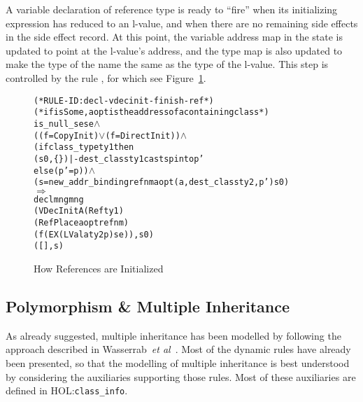 \documentclass[11pt]{article}
\newcommand{\lbr}{\texttt{\{}}
\newcommand{\rbr}{\texttt{\}}}
\newcommand{\HOLfile}[1]{HOL:\texttt{#1}}
\begin{document}
A variable declaration of reference type is ready to ``fire'' when its
initializing expression has reduced to an l-value, and when there are
no remaining side effects in the side effect record.  At this point,
the variable address map in the state is updated to point at the
l-value's address, and the type map is also updated to make the type
of the name the same as the type of the l-value.
This step is controlled by the rule ,
for which see Figure~\ref{fig:decl-vdecinit-finish-ref}.
\begin{figure}[hbtp]
\begin{center}
  \begin{minipage}{\textwidth}
%
\begin{alltt}
(* RULE-ID: decl-vdecinit-finish-ref *)
(* if isSome, aopt is the address of a containing class *)
     is_null_se se \(\land\)
     ((f = CopyInit) \(\lor\) (f = DirectInit)) \(\land\)
     (if class_type ty1 then
        (s0,\lbr\rbr) |- dest_class ty1 casts p into p'
      else (p' = p)) \(\land\)
     (s = new_addr_binding refnm aopt (a,dest_class ty2,p') s0)
   \(\Rightarrow\)
     declmng mng
             (VDecInitA (Ref ty1)
                        (RefPlace aopt refnm)
                        (f (EX (LVal a ty2 p) se)), s0)
             ([], s)
\end{alltt}
  \end{minipage}
\end{center}
\caption{How References are Initialized}
\label{fig:decl-vdecinit-finish-ref}
\end{figure}




\subsection{Polymorphism \& Multiple Inheritance}
\label{sec:multiple-inheritance}

As already suggested, multiple inheritance has been modelled by
following the approach described in Wasserrab~\emph{et
  al}~\cite{wasserrab-nst-OOPSLA06}.  Most of the dynamic rules have
already been presented, so that the modelling of multiple inheritance
is best understood by considering the auxiliaries supporting those
rules.  Most of these auxiliaries are defined in
\HOLfile{class_info}.

\newcommand{\fld}{\texttt{fld}}
\newcommand{\Cs}{\texttt{Cs}}
\end{document}

